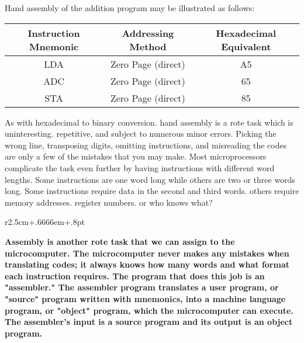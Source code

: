 \documentclass{book}
\begin{document}
Hand assembly of the addition program may be illustrated as follows:
\begin{table}[H]
\begin{tabular}{ccc}
Instruction Mnemonic & Addressing Method & Hexadecimal Equivalent \\ \hline
LDA & Zero Page (direct) & A5 \\
ADC & Zero Page (direct) & 65 \\
STA & Zero Page (direct) & 85
\end{tabular}
\end{table}
As with hexadecimal to binary conversion. hand assembly is a rote task which is uninteresting. repetitive, and subject to numerous minor errors. Picking the wrong line, transposing digits, omitting instructions, and misreading the codes are only a few of the mistakes that you may make. Most microprocessors complicate the task even further by having instructions with different word lengths. Some instructions are one word long while others are two or three words long. Some instructions require data in the second and third words. others require memory addresses. register numbers. or who knows what?\\
\begin{wrapfigure}{r}{2.5cm+.6666em+.8pt}
\end{wrapfigure}
\textbf{Assembly is another rote task that we can assign to the microcomputer. The microcomputer never makes any mistakes when translating codes; it always knows how many words and what format each instruction requires. The program that does this job is an "assembler." The assembler program translates a user program, or "source" program written with mnemonics, into a machine language program, or "object" program, which the microcomputer can execute. The assembler's input is a source program and its output is an object program.}\\
\end{document}
